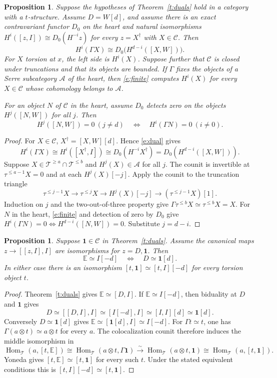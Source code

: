 \documentclass[11pt,reqno]{amsart}
\newtheorem{proposition}[theorem]{Proposition}
\theoremstyle{definition}
\DeclareMathOperator{\Hom}{Hom}
\newcommand{\T}{\mathcal T}
\newcommand{\one}{\mathbf 1}
\numberwithin{equation}{section}
\begin{document}
\begin{proposition}\label{p:length}
Suppose the hypotheses of Theorem~\ref{t:duals} hold in a category with a $t$-structure. Assume $D=W[d]$, and assume there is an exact contravariant functor $D_0$ on the heart and natural isomorphisms
$H^i([z,I])\cong D_0(H^{-i}z)$ for every $z=X^\dagger$ with $X\in\mathcal C$. Then
\begin{equation}\label{e:finite}
 H^i(\Gamma X)\cong D_0\big(H^{d-i}([X,W])\big).
\end{equation}
For $X$ torsion at $x$, the left side is $H^i(X)$. Suppose further that $\mathcal C$ is closed under truncations and that its objects are bounded. If $\Gamma$ fixes the objects of a Serre subcategory $\mathcal A$ of the heart, then \eqref{e:finite} computes $H^i(X)$ for every $X\in\mathcal C$ whose cohomology belongs to $\mathcal A$.

For an object $N$ of $\mathcal C$ in the heart, assume $D_0$ detects zero on the objects $H^j([N,W])$ for all $j$. Then
\[
 H^j([N,W])=0\ (j\ne d)
 \quad\Longleftrightarrow\quad
 H^i(\Gamma N)=0\ (i\ne0).
\]
\end{proposition}
\begin{proof}
For $X\in\mathcal C$, $X^\dagger=[X,W][d]$. Hence \eqref{e:dual} gives
\[
 H^i(\Gamma X)\cong H^i([X^\dagger,I])
 \cong D_0(H^{-i}X^\dagger)=D_0(H^{d-i}([X,W])).
\]
Suppose $X\in\T^{\ge a}\cap\T^{\le b}$ and $H^j(X)\in\mathcal A$ for all $j$. The counit is invertible at $\tau^{\le a-1}X=0$ and at each $H^j(X)[-j]$. Apply the counit to the truncation triangle
\[
 \tau^{\le j-1}X\longrightarrow\tau^{\le j}X
 \longrightarrow H^j(X)[-j]\longrightarrow(\tau^{\le j-1}X)[1].
\]
Induction on $j$ and the two-out-of-three property give $\Gamma\tau^{\le b}X\simeq\tau^{\le b}X=X$. For $N$ in the heart, \eqref{e:finite} and detection of zero by $D_0$ give $H^i(\Gamma N)=0\iff H^{d-i}([N,W])=0$. Substitute $j=d-i$.
\end{proof}

\begin{proposition}\label{p:residue}
Suppose $\one\in\mathcal C$ in Theorem~\ref{t:duals}. Assume the canonical maps $z\to[[z,I],I]$ are isomorphisms for $z=D,\one$. Then
\[
 \mathbb{E}\simeq I[-d]\quad\Longleftrightarrow\quad D\simeq\one[d].
\]
In either case there is an isomorphism $[t,\one]\simeq[t,I][-d]$ for every torsion object $t$.
\end{proposition}
\begin{proof}
Theorem~\ref{t:duals} gives $\mathbb E\simeq[D,I]$. If $\mathbb E\simeq I[-d]$, then biduality at $D$ and $\one$ gives
\[
 D\simeq[[D,I],I]\simeq[I[-d],I]\simeq[I,I][d]\simeq\one[d].
\]
Conversely $D\simeq\one[d]$ gives $\mathbb E\simeq[\one[d],I]\simeq I[-d]$. For $\Gamma t\simeq t$, one has $\Gamma(a\otimes t)\simeq a\otimes t$ for every $a$. The colocalization counit therefore induces the middle isomorphism in
\[
 \Hom_{\T}(a,[t,\mathbb E])\cong\Hom_{\T}(a\otimes t,\Gamma\one)
 \xrightarrow{\sim}\Hom_{\T}(a\otimes t,\one)\cong\Hom_{\T}(a,[t,\one]).
\]
Yoneda gives $[t,\mathbb E]\simeq[t,\one]$ for every such $t$. Under the stated equivalent conditions this is $[t,I][-d]\simeq[t,\one]$.
\end{proof}
\end{document}
